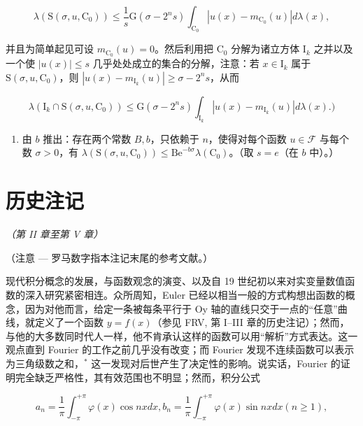 \[
\lambda \left(\mathrm{S} (\sigma , u, \mathrm{C} _ {0})\right) \leqslant \frac {1}{s} \mathrm{G} (\sigma - 2 ^ {n} s) \int_ {\mathrm{C} _ {0}} | u (x) - m _ {\mathrm{C} _ {0}} (u) | d \lambda (x),
\]

并且为简单起见可设 \(m_{\mathrm{C}_0}(u) = 0\)。然后利用把 \(\mathrm{C}_0\) 分解为诸立方体 \(\mathrm{I}_k\) 之并以及一个使 \(|u(x)| \leqslant s\) 几乎处处成立的集合的分解，注意：若 \(x \in \mathrm{I}_k\) 属于 \(\mathrm{S}(\sigma, u, \mathrm{C}_0)\)，则 \(|u(x) - m_{\mathrm{I}_k}(u)| \geqslant \sigma - 2^n s\)，从而

\[
\lambda \left(\mathrm{I} _ {k} \cap \mathrm{S} (\sigma , u, \mathrm{C} _ {0})\right) \leqslant \mathrm{G} (\sigma - 2 ^ {n} s) \int_ {\mathrm{I} _ {k}} | u (x) - m _ {\mathrm{I} _ {k}} (u) | d \lambda (x). \Big)
\]

\begin{enumerate}
\def\labelenumi{\alph{enumi})}
\setcounter{enumi}{2}
\tightlist
\item
  由 \(b\) 推出：存在两个常数 \(B, b\)，只依赖于 \(n\)，使得对每个函数 \(u \in \mathcal{F}\) 与每个数 \(\sigma > 0\)，有 \(\lambda(\mathrm{S}(\sigma, u, \mathrm{C}_0)) \leqslant \mathrm{Be}^{-b\sigma}\lambda(\mathrm{C}_0)\)。（取 \(s = e\)（在 \(b\) 中）。）
\end{enumerate}

\chapter*{历史注记}
{}

\begin{center}
\textit{（第 II 章至第 V 章）}
\end{center}

（注意 --- 罗马数字指本注记末尾的参考文献。）

现代积分概念的发展，与函数观念的演变、以及自 19 世纪初以来对实变量数值函数的深入研究紧密相连。众所周知，Euler 已经以相当一般的方式构想出函数的概念，因为对他而言，给定一条被每条平行于 Oy 轴的直线只交于一点的“任意”曲线，就定义了一个函数 \(y = f(x)\)（参见 FRV, 第 I--III 章的历史注记）；然而，与他的大多数同时代人一样，他不肯承认这样的函数可以用“解析”方式表达。这一观点直到 Fourier 的工作之前几乎没有改变；而 Fourier 发现不连续函数可以表示为三角级数之和，\(^{*}\) 这一发现对后世产生了决定性的影响。说实话，Fourier 的证明完全缺乏严格性，其有效范围也不明显；然而，积分公式

\[
a _ {n} = \frac {1}{\pi} \int_ {- \pi} ^ {+ \pi} \varphi (x) \cos n x d x, b _ {n} = \frac {1}{\pi} \int_ {- \pi} ^ {+ \pi} \varphi (x) \sin n x d x (n \geqslant 1),\tag{1}
\]

